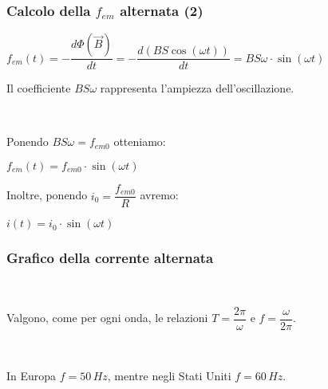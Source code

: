 \documentclass[]{beamer}
\theoremstyle{plain}
\newcommand{\fem}{f_{em}}
\newcommand{\femm}{f_{em0}}
\begin{document}
\begin{frame}
  \frametitle{Calcolo della $ \fem $ alternata (2)}
  \begin{center}
$ \fem (t) = - \dfrac{d \Phi (\vec{B})}{dt} = - \dfrac{d(BS\cos(\omega t))}{dt} = BS\omega\cdot\sin(\omega t) $
\end{center}\pause
  Il coefficiente $ BS\omega $ rappresenta l'ampiezza dell'oscillazione.\pause
  
  ~
  
  Ponendo $ BS\omega = \femm $ otteniamo:
  \begin{center}
\colorbox{blue!30}{$ \fem (t) = \femm \cdot \sin (\omega t) $}
\end{center}\pause
  Inoltre, ponendo $ i_0 = \dfrac{\femm}{R} $ avremo:
  \begin{center}
\colorbox{blue!30}{$ i (t) = i_0 \cdot \sin (\omega t) $}
\end{center}
\end{frame}

\begin{frame}
\frametitle{Grafico della corrente alternata}
\begin{figure}
\end{figure}

~

Valgono, come per ogni onda, le relazioni $ T = \dfrac{2 \pi}{\omega} $ e \colorbox{blue!30}{$ f = \dfrac{\omega}{2\pi} $}.\pause

~

In Europa $ f = 50 \, Hz $, mentre negli Stati Uniti $ f = 60 \, Hz $.
\end{frame}
\end{document}
